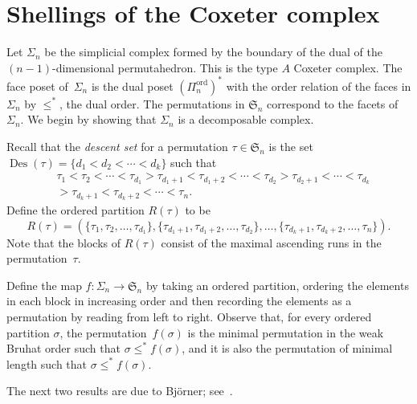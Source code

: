 \documentclass[ALCO,ThmDefs,Unicode,epreuves]{cedram}
\newcommand{\Sym}{\mathfrak{S}}
\DeclareMathOperator{\Des}{Des}
\DeclareMathOperator{\ord}{ord}
\newcommand{\Qn}{\Pi^{\ord}_{n}}
\begin{document}
\section{Shellings of the Coxeter complex}
\label{section_shellings_of_Coxeter_complex}


Let $\Sigma_{n}$ be the simplicial complex formed by
the boundary of the dual of the $(n-1)$-dimensional permutahedron.
This is the type $A$ Coxeter complex.
The face poset of~$\Sigma_{n}$ is the dual poset $(\Qn)^{*}$
with the order relation of the faces in $\Sigma_{n}$ by $\leq^{*}$,
the dual order.
The permutations in $\Sym_{n}$ correspond to
the facets of $\Sigma_{n}$.
We begin by showing that $\Sigma_{n}$ is a decomposable complex.

Recall that the \emph{descent set} 
for a permutation $\tau \in \Sym_{n}$
is the set $\Des(\tau) = \{d_{1} < d_{2} < \cdots < d_{k}\}$
such that
\begin{align*}
& \tau_{1} < \tau_{2} < \cdots < \tau_{d_{1}}
>
\tau_{d_{1}+1} < \tau_{d_{1}+2} < \cdots < \tau_{d_{2}}
>
\tau_{d_{2}+1}
< 
\cdots 
<
\tau_{d_{k}} \\
& >
\tau_{d_{k}+1} < \tau_{d_{k}+2} < \cdots < \tau_{n} .
\end{align*}
Define the ordered partition $R(\tau)$ to be
$$
R(\tau)
= 
(\{\tau_{1}, \tau_{2}, \ldots, \tau_{d_{1}}\},
\{\tau_{d_{1}+1}, \tau_{d_{1}+2}, \ldots, \tau_{d_{2}}\},
\ldots,
\{\tau_{d_{k}+1}, \tau_{d_{k}+2}, \ldots, \tau_{n}\}) . 
$$
Note that the blocks of $R(\tau)$ consist of the maximal ascending runs
in the permutation~$\tau$.

Define the map $f : \Sigma_{n} \longrightarrow \Sym_{n}$
by taking an ordered partition,
ordering the elements in each block in increasing order and then
recording the elements as a permutation by reading from left to right.
Observe that, for every ordered partition $\sigma$, the permutation~$f(\sigma)$
is the minimal permutation in the weak Bruhat order
such that $\sigma\leq^* f(\sigma)$, and it is also the permutation of
minimal length such that $\sigma\leq^* f(\sigma)$.

The next two results are due to Bj\"orner;
see~\cite[Theorem~2.1]{Bjorner_II}.
\end{document}
